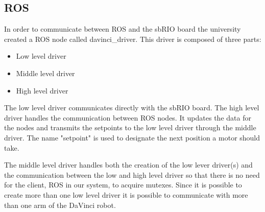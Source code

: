 \subsection{ROS}\label{sec:ros}

In order to communicate between ROS and the sbRIO board the university created a ROS node called davinci\_driver. This driver is composed of three parts:

\begin{itemize}
\item Low level driver
\item Middle level driver
\item High level driver
\end{itemize}

The low level driver communicates directly with the sbRIO board. The high level driver handles the communication between ROS nodes. It updates the data for the nodes and transmits the setpoints to the low level driver through the middle driver. The name "setpoint" is used to designate the next position a motor should take.

The middle level driver handles both the creation of the low lever driver(s) and the communication between the low and high level driver so that there is no need for the client, ROS in our system, to acquire mutexes. Since it is possible to create more than one low level driver it is possible to communicate with more than one arm of the DaVinci robot.

